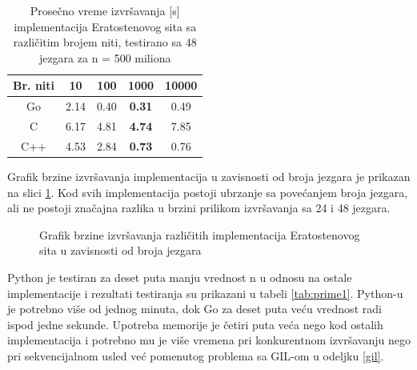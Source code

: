 \documentclass[12pt,oneside]{memoir}
\begin{document}
\begin{table}
\begin{center}
\caption{Prosečno vreme izvršavanja [s] implementacija Eratostenovog sita sa različitim brojem niti, testirano sa 48 jezgara za n = 500 miliona}
\begin{tabular}{||c||c c c c||}
\hline
Br. niti		&10 &100 &1000 &10000\\ \hline
Go	&2.14	&0.40	&\textbf{0.31}&0.49\\ \hline
C	&6.17	&4.81	&\textbf{4.74}&7.85\\ \hline
C++  &4.53	&2.84	&\textbf{0.73}&0.76\\ \hline
\end{tabular}
\label{tab:prime5}
\end{center}
\end{table}
\vspace*{-\baselineskip}


Grafik brzine izvršavanja implementacija u zavisnosti od broja jezgara je prikazan na slici \ref{fig:prime3}. Kod svih implementacija postoji ubrzanje sa povećanjem broja jezgara, ali ne postoji značajna razlika u brzini prilikom izvršavanja sa 24 i 48 jezgara.
\\

\begin{figure}
\begin{center}


\caption{Grafik brzine izvršavanja različitih implementacija Eratostenovog sita u zavisnosti od broja jezgara}
\label{fig:prime3}
\end{center}
\end{figure}

Python je testiran za deset puta manju vrednost n u odnosu na ostale implementacije i rezultati testiranja su prikazani u tabeli \ref{tab:prime1}. Python-u je potrebno više od jednog minuta, dok Go za deset puta veću vrednost radi ispod jedne sekunde. Upotreba memorije je četiri puta veća nego kod ostalih implementacija i potrebno mu je više vremena pri konkurentnom izvršavanju nego pri sekvencijalnom usled već pomenutog problema sa GIL-om u odeljku \ref{gil}.
\\
\end{document}
